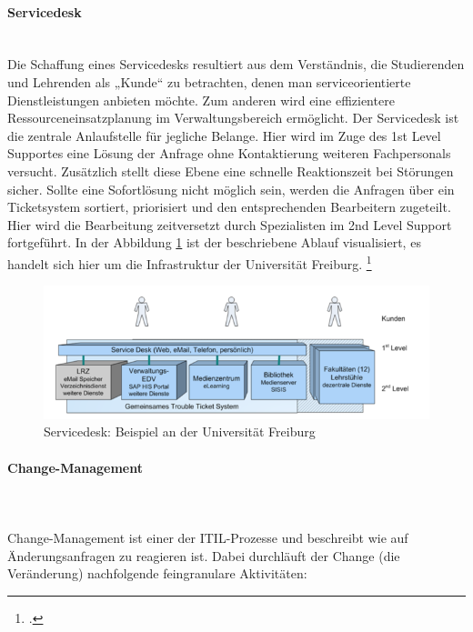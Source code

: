 \paragraph{Servicedesk}\mbox{}\\	
\label{subsubsection_service_desk}
Die Schaffung eines Servicedesks resultiert aus dem Verständnis, die Studierenden und Lehrenden als „Kunde“ zu betrachten, denen man serviceorientierte Dienstleistungen anbieten möchte. Zum anderen wird eine effizientere Ressourceneinsatzplanung im Verwaltungsbereich ermöglicht. Der Servicedesk ist die zentrale Anlaufstelle für jegliche Belange. Hier wird im Zuge des 1st Level Supportes eine Lösung der Anfrage ohne Kontaktierung weiteren Fachpersonals versucht. Zusätzlich stellt diese Ebene eine schnelle Reaktionszeit bei Störungen sicher. Sollte eine Sofortlösung nicht möglich sein, werden die Anfragen über ein Ticketsystem sortiert, priorisiert und den entsprechenden Bearbeitern zugeteilt. Hier wird die Bearbeitung zeitversetzt durch Spezialisten im 2nd Level Support fortgeführt. In der Abbildung \ref{fig_service_desk} ist der beschriebene Ablauf visualisiert, es handelt sich hier um die Infrastruktur der Universität Freiburg. \footcite[Vgl.][5]{klug_2008}

\begin{figure}[h!]
	\centering
	\includegraphics[width=15cm]{kapitel/gruppe1_2/bilder/ServiceDesk}
	\caption{Servicedesk: Beispiel an der Universität Freiburg\protect\footnotemark}
	\label{fig_service_desk}
\end{figure}



\paragraph{Change-Management}\mbox{}\\\\
Change-Management ist einer der ITIL-Prozesse und beschreibt wie auf Änderungsanfragen zu reagieren ist. Dabei durchläuft der Change (die Veränderung) nachfolgende feingranulare Aktivitäten:

